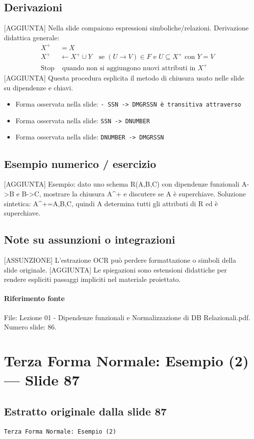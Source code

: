 \documentclass[11pt]{article}
\begin{document}
\subsection*{Derivazioni}
[AGGIUNTA] Nella slide compaiono espressioni simboliche/relazioni. Derivazione didattica generale:
\begin{align*}
X^+ &= X \\
X^+ &\leftarrow X^+ \cup Y \quad \text{se } (U \to V) \in F \text{ e } U \subseteq X^+ \text{ con } Y=V \\
\text{Stop} &\text{ quando non si aggiungono nuovi attributi in } X^+
\end{align*}
[AGGIUNTA] Questa procedura esplicita il metodo di chiusura usato nelle slide su dipendenze e chiavi.
\begin{itemize}[leftmargin=*]
\item Forma osservata nella slide: \texttt{-    SSN -> DMGRSSN è transitiva attraverso}
\item Forma osservata nella slide: \texttt{SSN -> DNUMBER}
\item Forma osservata nella slide: \texttt{DNUMBER -> DMGRSSN}
\end{itemize}
\subsection*{Esempio numerico / esercizio}
[AGGIUNTA] Esempio: dato uno schema R(A,B,C) con dipendenze funzionali A->B e B->C, mostrare la chiusura A^+ e discutere se A è superchiave. Soluzione sintetica: A^+={A,B,C}, quindi A determina tutti gli attributi di R ed è superchiave.
\subsection*{Note su assunzioni o integrazioni}
[ASSUNZIONE] L'estrazione OCR può perdere formattazione o simboli della slide originale.
[AGGIUNTA] Le spiegazioni sono estensioni didattiche per rendere espliciti passaggi impliciti nel materiale proiettato.
\paragraph{Riferimento fonte} File: Lezione 01 - Dipendenze funzionali e Normalizzazione di DB Relazionali.pdf. Numero slide: 86.
\section{Terza Forma Normale: Esempio (2) --- Slide 87}
\subsection*{Estratto originale dalla slide 87}
\begin{lstlisting}
Terza Forma Normale: Esempio (2)
\end{lstlisting}
\end{document}
